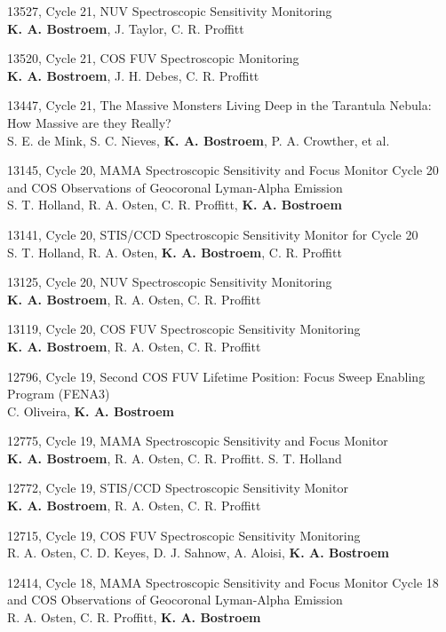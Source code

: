 \documentclass{res}
\begin{document}
\begin{resume}
13527, Cycle 21, NUV Spectroscopic Sensitivity Monitoring \\
{\bf K. A. Bostroem}, J. Taylor, C. R. Proffitt

13520, Cycle 21, COS FUV Spectroscopic Monitoring \\
{\bf K. A. Bostroem}, J. H. Debes, C. R. Proffitt

13447, Cycle 21, The Massive Monsters Living Deep in the Tarantula Nebula: How Massive are they Really? \\
S. E. de Mink, S. C. Nieves, {\bf K. A. Bostroem}, P. A. Crowther, et al.

13145, Cycle 20, MAMA Spectroscopic Sensitivity and Focus Monitor Cycle 20 and COS Observations of Geocoronal Lyman-Alpha Emission \\
S. T. Holland, R. A. Osten, C. R. Proffitt, {\bf K. A. Bostroem}

13141, Cycle 20, STIS/CCD Spectroscopic Sensitivity Monitor for Cycle 20 \\
S. T. Holland, R. A. Osten, {\bf K. A. Bostroem}, C. R. Proffitt

13125, Cycle 20, NUV Spectroscopic Sensitivity Monitoring \\
{\bf K. A. Bostroem}, R. A. Osten, C. R. Proffitt

13119, Cycle 20, COS FUV Spectroscopic Sensitivity Monitoring \\
{\bf K. A. Bostroem}, R. A. Osten, C. R. Proffitt

12796, Cycle 19, Second COS FUV Lifetime Position: Focus Sweep Enabling Program (FENA3) \\
C. Oliveira, {\bf K. A. Bostroem}

12775, Cycle 19, MAMA Spectroscopic Sensitivity and Focus Monitor \\
{\bf K. A. Bostroem}, R. A. Osten, C. R. Proffitt. S. T. Holland

12772, Cycle 19, STIS/CCD Spectroscopic Sensitivity Monitor \\
{\bf K. A. Bostroem}, R. A. Osten, C. R. Proffitt

12715, Cycle 19, COS FUV Spectroscopic Sensitivity Monitoring \\
R. A. Osten, C. D. Keyes, D. J. Sahnow, A. Aloisi, {\bf K. A. Bostroem}

12414, Cycle 18, MAMA Spectroscopic Sensitivity and Focus Monitor Cycle 18 and COS Observations of Geocoronal Lyman-Alpha Emission \\
R. A. Osten, C. R. Proffitt, {\bf K. A. Bostroem}


\end{resume}
\end{document}
